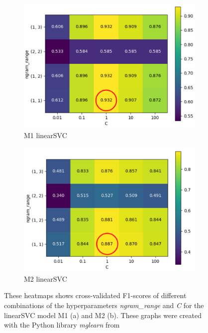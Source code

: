 \begin{figure}[h!]
 \begin{subfigure}{0.5\textwidth}
   \centering
   \includegraphics[width=0.9\linewidth]{img/m1_F1_ngram_C_heatmap_w_Circle.pdf}
   \caption{M1 linearSVC}
   \label{fig:m1_heatmap}
\end{subfigure}
\begin{subfigure}{0.5\textwidth}
   \centering
   \includegraphics[width=0.9\linewidth]{img/m2_ngram_C_heatmap_new_w_circle.pdf}
   \caption{M2 linearSVC}
   \label{fig:m2_heatmap}
 \end{subfigure}
\caption{These heatmaps shows cross-validated F1-scores of different combinations of the hyperparameters \textit{ngram\_range} and \textit{C} for the linearSVC model M1 (a) and M2 (b). These graphs were created with the Python library \textit{mglearn} from \textcite{Guido2016}}
\label{fig:heatmaps}
\end{figure}

